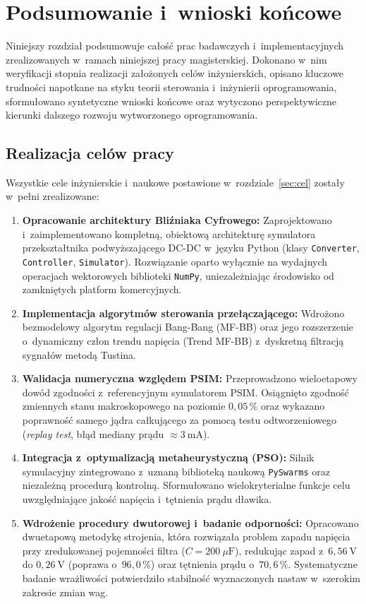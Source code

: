 \chapter{Podsumowanie i~wnioski końcowe}
\label{ch:podsumowanie}

Niniejszy rozdział podsumowuje całość prac badawczych i~implementacyjnych zrealizowanych w~ramach niniejszej pracy magisterskiej. Dokonano w~nim weryfikacji stopnia realizacji założonych celów inżynierskich, opisano kluczowe trudności napotkane na styku teorii sterowania i~inżynierii oprogramowania, sformułowano syntetyczne wnioski końcowe oraz wytyczono perspektywiczne kierunki dalszego rozwoju wytworzonego oprogramowania.

\section{Realizacja celów pracy}
\label{sec:realizacja-celow}

Wszystkie cele inżynierskie i~naukowe postawione w~rozdziale~\ref{sec:cel} zostały w~pełni zrealizowane:
\begin{enumerate}
    \item \textbf{Opracowanie architektury Bliźniaka Cyfrowego:} Zaprojektowano i~zaimplementowano kompletną, obiektową architekturę symulatora przekształtnika podwyższającego DC-DC w~języku Python (klasy \texttt{Converter}, \texttt{Controller}, \texttt{Simulator}). Rozwiązanie oparto wyłącznie na wydajnych operacjach wektorowych biblioteki \texttt{NumPy}, uniezależniając środowisko od zamkniętych platform komercyjnych.
    \item \textbf{Implementacja algorytmów sterowania przełączającego:} Wdrożono bezmodelowy algorytm regulacji Bang-Bang (MF-BB) oraz jego rozszerzenie o~dynamiczny człon trendu napięcia (Trend MF-BB) z~dyskretną filtracją sygnałów metodą Tustina.
    \item \textbf{Walidacja numeryczna względem PSIM:} Przeprowadzono wieloetapowy dowód zgodności z~referencyjnym symulatorem PSIM. Osiągnięto zgodność zmiennych stanu makroskopowego na poziomie $0{,}05\,\%$ oraz wykazano poprawność samego jądra całkującego za pomocą testu odtworzeniowego (\emph{replay test}, błąd mediany prądu $\approx 3~\mathrm{mA}$).
    \item \textbf{Integracja z~optymalizacją metaheurystyczną (PSO):} Silnik symulacyjny zintegrowano z~uznaną biblioteką naukową \texttt{PySwarms} oraz niezależną procedurą kontrolną. Sformułowano wielokryterialne funkcje celu uwzględniające jakość napięcia i~tętnienia prądu dławika.
    \item \textbf{Wdrożenie procedury dwutorowej i~badanie odporności:} Opracowano dwuetapową metodykę strojenia, która rozwiązała problem zapadu napięcia przy zredukowanej pojemności filtra ($C = 200~\mu\mathrm{F}$), redukując zapad z~$6{,}56~\mathrm{V}$ do $0{,}26~\mathrm{V}$ (poprawa o~$96{,}0\,\%$) oraz tętnienia prądu o~$70{,}6\,\%$. Systematyczne badanie wrażliwości potwierdziło stabilność wyznaczonych nastaw w~szerokim zakresie zmian wag.
\end{enumerate}

